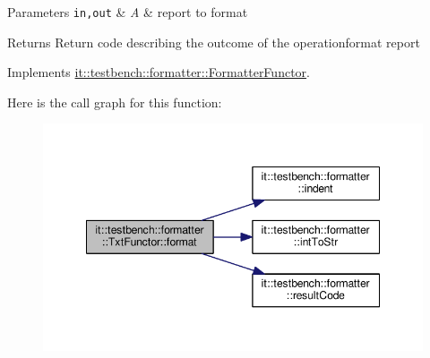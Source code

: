 \begin{DoxyParams}[1]{Parameters}
\mbox{\tt in,out}  & {\em A} & report to format \\
\hline
\end{DoxyParams}
\begin{DoxyReturn}{Returns}
Return code describing the outcome of the operationformat report 
\end{DoxyReturn}


Implements \hyperlink{classit_1_1testbench_1_1formatter_1_1FormatterFunctor_a37bda4de0839c23a0b406d898cf435c3}{it\-::testbench\-::formatter\-::\-Formatter\-Functor}.



Here is the call graph for this function\-:
\nopagebreak
\begin{figure}[H]
\begin{center}
\leavevmode
\includegraphics[width=348pt]{d3/d73/classit_1_1testbench_1_1formatter_1_1TxtFunctor_ad172e2a419acff495920555b83a274a9_cgraph}
\end{center}
\end{figure}




